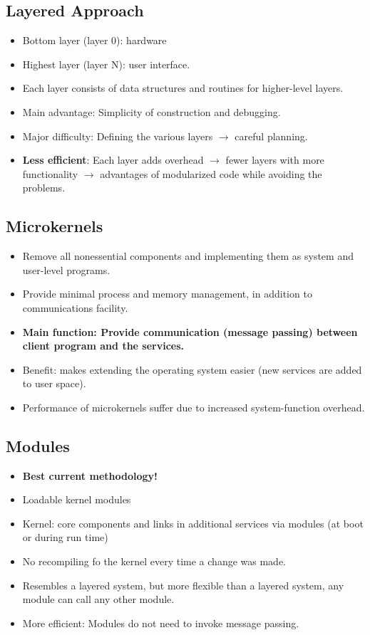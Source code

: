 \documentclass[10pt]{report}
\begin{document}
        \subsection{Layered Approach}
          \begin{itemize}
            \item Bottom layer (layer 0): hardware
            \item Highest layer (layer N): user interface.
            \item Each layer consists of data structures and routines for higher-level layers.
            \item Main advantage: Simplicity of construction and debugging.
            \item Major difficulty: Defining the various layers $\rightarrow$ careful planning.
            \item \textbf{Less efficient}: Each layer adds overhead $\rightarrow$ fewer layers with more functionality $\rightarrow$ advantages of modularized code while avoiding the problems.
          \end{itemize}

        \subsection{Microkernels}
          \begin{itemize}
            \item Remove all nonessential components and implementing them as system and user-level programs.
            \item Provide minimal process and memory management, in addition to communications facility.
            \item \textbf{Main function: Provide communication (message passing) between client program and the services.}
            \item Benefit: makes extending the operating system easier (new services are added to user space).
            \item Performance of microkernels suffer due to increased system-function overhead.
          \end{itemize}

        \subsection{Modules}
          \begin{itemize}
            \item \textbf{Best current methodology!}
            \item Loadable kernel modules
            \item Kernel: core components and links in additional services via modules (at boot or during run time)
            \item No recompiling fo the kernel every time a change was made.
            \item Resembles a layered system, but more flexible than a layered system, any module can call any other module.
            \item More efficient: Modules do not need to invoke message passing.
          \end{itemize}
\end{document}

